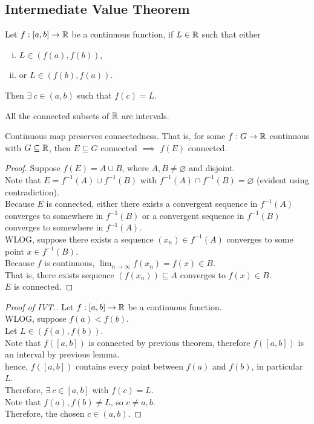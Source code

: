\documentclass[11pt]{article}
\begin{document}
	\subsection{Intermediate Value Theorem}
	\begin{theorem}
		Let $f: [a, b] \to \mathbb{R}$ be a continuous function, if $L \in \mathbb{R}$ such that either
		\begin{enumerate}[(i)]
			\item $L \in (f(a), f(b))$,
			\item or $L \in (f(b), f(a))$.
		\end{enumerate}
		Then $\exists\ c \in (a, b)$ such that $f(c) = L$.
	\end{theorem}
	
	\begin{lemma}
		All the connected subsets of $\mathbb{R}$ are intervals.
	\end{lemma}
	
	\begin{theorem}
		Continuous map preserves connectedness. That is, for some $f: G \to \mathbb{R}$ continuous with $G \subseteq \mathbb{R}$, then $E \subseteq G$ connected $\implies$ $f(E)$ connected.
	\end{theorem}
	
	\begin{proof}
		Suppose $f(E) = A \cup B$, where $A, B \neq \varnothing$ and disjoint. \\
		Note that $E = f^{-1}(A) \cup f^{-1}(B)$ with $f^{-1}(A) \cap f^{-1}(B) = \varnothing$ (evident using contradiction). \\
		Because $E$ is connected, either there exists a convergent sequence in $f^{-1}(A)$ converges to somewhere in $f^{-1}(B)$ or a convergent sequence in $f^{-1}(B)$ converges to somewhere in $f^{-1}(A)$. \\
		WLOG, suppose there exists a sequence $(x_n) \in f^{-1}(A)$ converges to some point $x \in f^{-1}(B)$. \\
		Because $f$ is continuous, $\lim_{n \to \infty} f(x_n) = f(x) \in B$. \\
		That is, there exists sequence $(f(x_n)) \subseteq A$ converges to $f(x) \in B$. \\
		$E$ is connected.
	\end{proof}
	
	\begin{proof}[Proof of IVT.]
		Let $f: [a, b] \to \mathbb{R}$ be a continuous function. \\
		WLOG, suppose $f(a) < f(b)$. \\
		Let $L \in (f(a), f(b))$. \\
		Note that $f([a, b])$ is connected by previous theorem, therefore $f([a, b])$ is an interval by previous lemma. \\
		hence, $f([a, b])$ contains every point between $f(a)$ and $f(b)$, in particular $L$. \\
		Therefore, $\exists\ c \in [a, b]$ with $f(c) = L$. \\
		Note that $f(a), f(b) \neq L$, so $c \neq a, b$. \\
		Therefore, the chosen $c \in (a, b)$.
	\end{proof}
	
\end{document}
